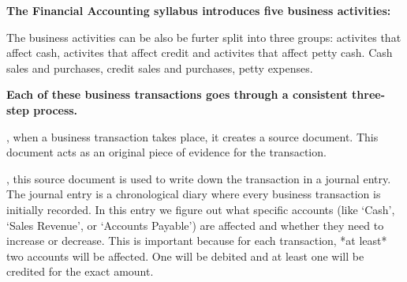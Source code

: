 
\scriptsize{


    \textbf{The Financial Accounting syllabus introduces five business activities:}

  The business activities can be also be furter split into three groups: activites that affect cash, activites that affect credit and activites that affect petty cash. Cash sales and purchases, credit sales and purchases, petty expenses. 

  \textbf{Each of these business transactions goes through a consistent three-step process.}

   , when a business transaction takes place, it creates a source document. This document acts as an original piece of evidence for the transaction. 
     
   , this source document is used to write down the transaction in a journal entry. The journal entry is a chronological diary where every business transaction is initially recorded. In this entry we figure out what specific accounts (like `Cash', `Sales Revenue', or `Accounts Payable') are affected and whether they need to increase or decrease.  This is important because for each transaction, *at least* two accounts will be affected. One will be debited and at least one will be credited for the exact amount. 
     
}
